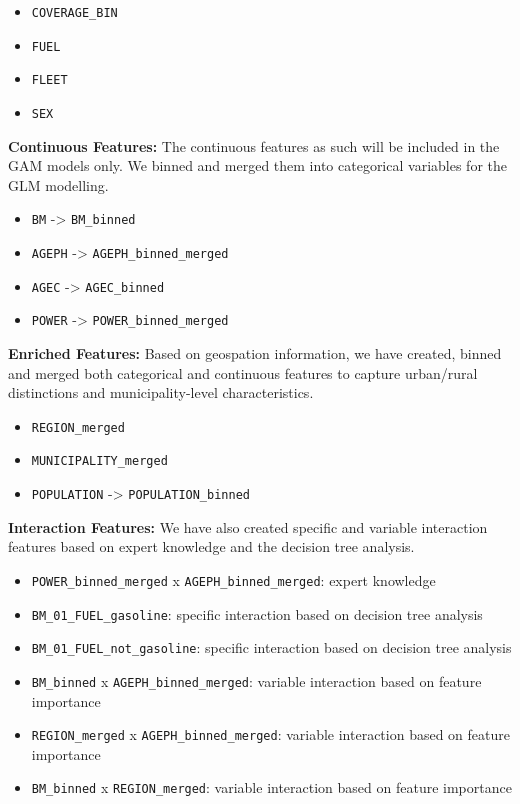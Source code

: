 \documentclass[
  english,
  11pt,
]{article}
\providecommand{\tightlist}{%
  \setlength{\itemsep}{0pt}\setlength{\parskip}{0pt}}
\begin{document}
\begin{itemize}
\tightlist
\item
  \texttt{COVERAGE\_BIN}
\item
  \texttt{FUEL}
\item
  \texttt{FLEET}
\item
  \texttt{SEX}
\end{itemize}

\textbf{Continuous Features:} The continuous features as such will be
included in the GAM models only. We binned and merged them into
categorical variables for the GLM modelling.

\begin{itemize}
\tightlist
\item
  \texttt{BM} -\textgreater{} \texttt{BM\_binned}
\item
  \texttt{AGEPH} -\textgreater{} \texttt{AGEPH\_binned\_merged}
\item
  \texttt{AGEC} -\textgreater{} \texttt{AGEC\_binned}
\item
  \texttt{POWER} -\textgreater{} \texttt{POWER\_binned\_merged}
\end{itemize}

\textbf{Enriched Features:} Based on geospation information, we have
created, binned and merged both categorical and continuous features to
capture urban/rural distinctions and municipality-level characteristics.

\begin{itemize}
\tightlist
\item
  \texttt{REGION\_merged}
\item
  \texttt{MUNICIPALITY\_merged}
\item
  \texttt{POPULATION} -\textgreater{} \texttt{POPULATION\_binned}
\end{itemize}

\textbf{Interaction Features:} We have also created specific and
variable interaction features based on expert knowledge and the decision
tree analysis.

\begin{itemize}
\tightlist
\item
  \texttt{POWER\_binned\_merged} x \texttt{AGEPH\_binned\_merged}:
  expert knowledge
\item
  \texttt{BM\_01\_FUEL\_gasoline}: specific interaction based on
  decision tree analysis
\item
  \texttt{BM\_01\_FUEL\_not\_gasoline}: specific interaction based on
  decision tree analysis
\item
  \texttt{BM\_binned} x \texttt{AGEPH\_binned\_merged}: variable
  interaction based on feature importance
\item
  \texttt{REGION\_merged} x \texttt{AGEPH\_binned\_merged}: variable
  interaction based on feature importance
\item
  \texttt{BM\_binned} x \texttt{REGION\_merged}: variable interaction
  based on feature importance
\end{itemize}
\end{document}
